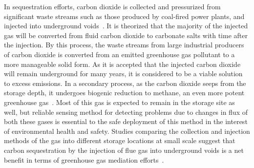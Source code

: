 \documentclass[numbook, envcountsect, envcountsame, envcountreset, runningheads, twocolumn]{svjour3}
\begin{document}
		In sequestration efforts, carbon dioxide is collected and pressurized from significant waste streams such as those produced by coal-fired power plants, and injected into underground voids~\cite{white_separation_2003}.  It is theorized that the majority of the injected gas will be converted from fluid carbon dioxide to carbonate salts with time after the injection.  By this process, the waste streams from large industrial producers of carbon dioxide is converted from an emitted greenhouse gas pollutant to a more manageable solid form.  As it is accepted that the injected carbon dioxide will remain underground for many years, it is considered to be a viable solution to excess emissions.  In a secondary process, as the carbon dioxide seeps from the storage depth, it undergoes biogenic reduction to methane, an even more potent greenhouse gas~\cite{romanak_process-based_2012}. Most of this gas is expected to remain in the storage site as well, but reliable sensing method for detecting problems due to changes in flux of both these gases is essential to the safe deployment of this method in the interest of environmental health and safety.  Studies comparing the collection and injection methods of the gas into different storage locations at small scale suggest that carbon sequestration by the injection of flue gas into underground voids is a net benefit in terms of greenhouse gas mediation efforts~\cite{khoo_life_2006}.  
		
		
\end{document}

